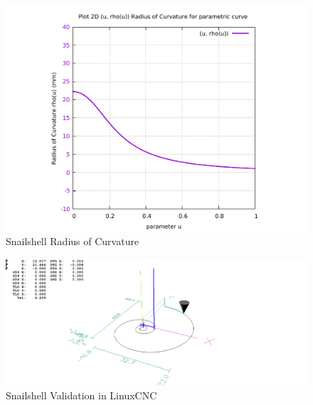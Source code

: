 \begin{figure}
	\caption     {Snailshell Radius of Curvature}
	\label{02-img-Snailshell Radius of Curvature.pdf}
	\includegraphics[width=1.00\textwidth]{Chap4/appendix/app-Snailshell/plots/02-img-Snailshell Radius of Curvature.pdf} 
\end{figure}	


\clearpage
\pagebreak

\begin{figure}
	\caption     {Snailshell Validation in LinuxCNC}
	\label{03-img-Snailshell-Validation-in-LinuxCNC.png}
	\includegraphics[width=1.00\textwidth]{Chap4/appendix/app-Snailshell/plots/03-img-Snailshell-Validation-in-LinuxCNC.png}
\end{figure}


